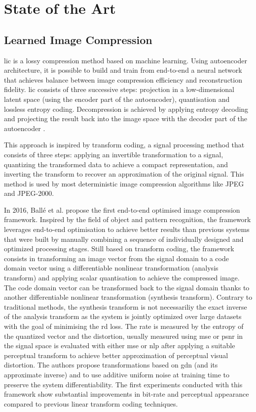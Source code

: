 \chapter{State of the Art}
\label{sota}

\section{Learned Image Compression}
\acrfull{lic} is a lossy compression method based on machine learning. Using autoencoder architecture, it is possible to build and train from end-to-end a neural network that achieves balance between image compression efficiency and reconstruction fidelity. \acrshort{lic} consists of three successive steps: projection in a low-dimensional latent space (using the encoder part of the autoencoder), quantisation and lossless entropy coding. Decompression is achieved by applying entropy decoding and projecting the result back into the image space with the decoder part of the autoencoder \cite{licmedium, licstanford}.

This approach is inspired by transform coding, a signal processing method that consists of three steps: applying an invertible transformation to a signal, quantizing the transformed data to achieve a compact representation, and inverting the transform to recover an approximation of the original signal. This method is used by most deterministic image compression algorithms like JPEG and JPEG-2000.

In 2016, Ballé et al. \cite{ballé2016endtoendoptimizationnonlineartransform} propose the first end-to-end optimised image compression framework. Inspired by the field of object and pattern recognition, the framework leverages end-to-end optimisation to achieve better results than previous systems that were built by manually combining a sequence of individually designed and optimized processing stages. Still based on transform coding, the framework consists in transforming an image vector from the signal domain to a code domain vector using a differentiable nonlinear transformation (analysis transform) and applying scalar quantisation to achieve the compressed image. The code domain vector can be transformed back to the signal domain thanks to another differentiable nonlinear transformation (synthesis transform). Contrary to traditional methods, the synthesis transform is not necessariliy the exact inverse of the analysis transform as the system is jointly optimized over large datasets with the goal of minimising the \acrfull{rd} loss. The rate is measured by the entropy of the quantized vector and the distortion, usually measured using \acrshort{mse} or \acrshort{psnr} in the signal space is evaluated with either \acrshort{mse} or \acrfull{nlp} after applying a suitable perceptual transform to achieve better approximation of perceptual visual distortion. The authors propose transformations based on \acrfull{gdn} (and its approximate inverse) and to use additive uniform noise at training time to preserve the system differentiability. The first experiments conducted with this framework show substantial improvements in bit-rate and perceptual appearance compared to previous linear transform coding techniques.

